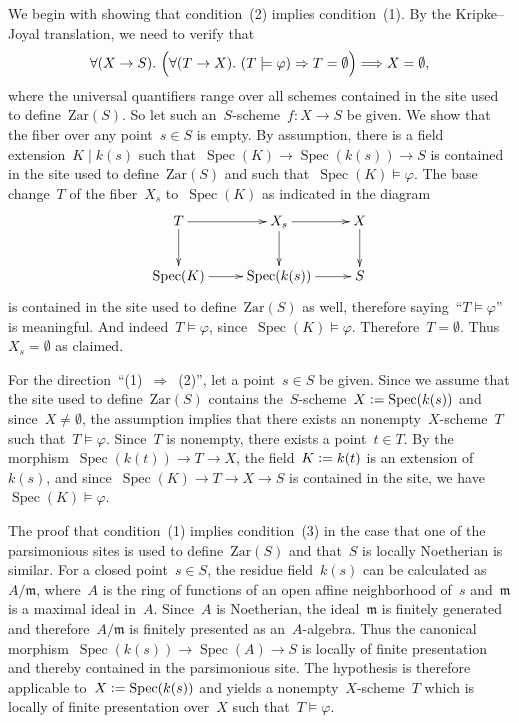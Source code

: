 \documentclass[10pt,reqno,a4paper]{amsbook}
\makeatletter
\theoremstyle{definition}
\theoremstyle{plain}
\theoremstyle{remark}
\newcommand{\mmm}{\mathfrak{m}}
\newcommand{\Zar}{\mathrm{Zar}}
\DeclareMathOperator{\Spec}{Spec}
\newcommand{\?}{\,{:}\,}
\renewcommand{\_}{\mathpunct{.}\,}
\newcommand{\fieldext}{\mathrel{|}}
\newcommand{\defeq}{\vcentcolon=}
\renewenvironment{proof}[1][\proofname]{\par
  \pushQED{\qed}%
  \normalfont \topsep6\p@\@plus6\p@\relax
  \trivlist
  \item[\hskip\labelsep
        \itshape
    #1\@addpunct{.}]\ignorespaces
}{%
  \popQED\endtrivlist\@endpefalse
}
\makeatother
\begin{document}
\begin{proof}We begin with showing that condition~(2) implies condition~(1). By
the Kripke--Joyal translation, we need to verify that
\[ \forall (X \to S)\_
  \Bigl(\forall (T \to X)\_ (T \models \varphi) \Rightarrow T = \emptyset\Bigr)
  \Longrightarrow X = \emptyset, \]
where the universal quantifiers range over all schemes contained in the site
used to define~$\Zar(S)$. So let such an~$S$-scheme~$f : X \to S$ be given. We
show that the fiber over any point~$s \in S$ is empty. By assumption, there is
a field extension~$K \fieldext k(s)$ such that~$\Spec(K) \to \Spec(k(s)) \to S$
is contained in the site used to define~$\Zar(S)$ and such that~$\Spec(K)
\models \varphi$. The base change~$T$ of the fiber~$X_s$ to~$\Spec(K)$ as
indicated in the diagram
\[ \xymatrix{
  T \ar[r]\ar[d] & X_s \ar[r]\ar[d] & X \ar[d] \\
  \Spec(K) \ar[r] & \Spec(k(s)) \ar[r] & S
} \]
is contained in the site used to define~$\Zar(S)$ as well, therefore
saying~``$T \models \varphi$'' is meaningful. And indeed~$T \models \varphi$,
since~$\Spec(K) \models \varphi$. Therefore~$T = \emptyset$. Thus~$X_s =
\emptyset$ as claimed.

For the direction~``(1)~$\Rightarrow$~(2)'', let a point~$s \in S$ be given.
Since we assume that the site used to define~$\Zar(S)$ contains
the~$S$-scheme~$X \defeq \Spec(k(s))$ and since~$X \neq \emptyset$, the
assumption implies that there exists an nonempty~$X$-scheme~$T$ such that~$T
\models \varphi$.  Since~$T$ is nonempty, there exists a point~$t \in T$. By
the morphism~$\Spec(k(t)) \to T \to X$, the field~$K \defeq k(t)$ is an
extension of~$k(s)$, and since~$\Spec(K) \to T \to X \to S$ is contained in the
site, we have~$\Spec(K) \models \varphi$.

The proof that condition~(1) implies condition~(3) in the case that one of the
parsimonious sites is used to define~$\Zar(S)$ and that~$S$ is locally
Noetherian is similar. For a closed point~$s \in S$, the residue field~$k(s)$
can be calculated as~$A/\mmm$, where~$A$ is the ring of functions of an open
affine neighborhood of~$s$ and~$\mmm$ is a maximal ideal in~$A$. Since~$A$ is
Noetherian, the ideal~$\mmm$ is finitely generated and therefore~$A/\mmm$ is
finitely presented as an~$A$-algebra. Thus the canonical morphism~$\Spec(k(s))
\to \Spec(A) \to S$ is locally of finite presentation and thereby contained in
the parsimonious site. The hypothesis is therefore applicable to~$X \defeq
\Spec(k(s))$ and yields a nonempty~$X$-scheme~$T$ which is locally of finite
presentation over~$X$ such that~$T \models \varphi$.


\end{proof}
\end{document}
